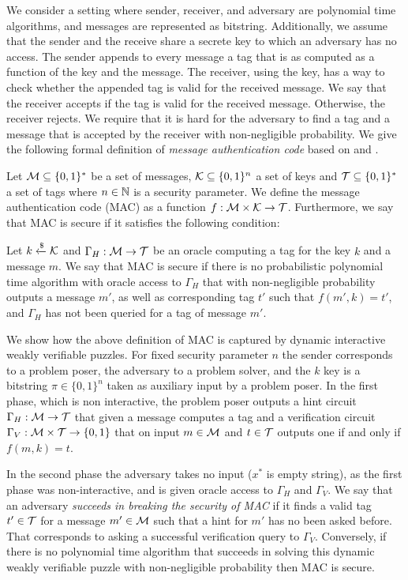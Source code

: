 \documentclass[11pt,a4paper,titlepage]{memoir}
\begin{document}
We consider a setting where sender, receiver, and adversary are polynomial time algorithms, and messages are represented as bitstring.
Additionally, we assume that the sender and the receive share a secrete key to which an adversary has no access.
The sender appends to every message a tag that is as computed as a function of the key and the message.
The receiver, using the key, has a way to check whether the appended tag is valid for the received message.
We say that the receiver accepts if the tag is valid for the received message. Otherwise, the receiver rejects.
We require that it is hard for the adversary to find a tag and a message that is accepted by the receiver with non-negligible probability.
We give the following formal definition of \textit{message authentication code} based on \cite{LectureNotesCrypo} and \cite{Goldreich:2004:FCV:975541}.
\begin{definition}
  Let $\mathcal{M} \subseteq \{0,1\}^*$ be a set of messages, $\mathcal{K} \subseteq \{0,1\}^{n}$ a set of keys and $\mathcal{T} \subseteq \{0,1\}^*$ a set of tags where $n \in \mathbb{N}$
  is a security parameter. We define the \textnormal{message authentication code (MAC)} as a function $f:\mathcal{M} \times \mathcal{K} \rightarrow \mathcal{T}$.
  Furthermore, we say that MAC is secure if it satisfies the following condition:

  Let $k \xleftarrow{\$} \mathcal{K}$ and $\Gamma_H: \mathcal{M} \rightarrow \mathcal{T}$ be an oracle computing
  a tag for the key $k$ and a message $m$. We say that MAC is secure if there is no probabilistic polynomial time algorithm with oracle access to $\Gamma_H$
  that with non-negligible probability outputs a message $m'$, as well as corresponding tag $t'$ such that $f(m', k) = t'$,
  and $\Gamma_H$ has not been queried for a tag of message $m'$.
\end{definition}

We show how the above definition of MAC is captured by dynamic interactive weakly verifiable puzzles.
For fixed security parameter $n$ the sender corresponds to a problem poser, the adversary to a problem solver, and
the $k$ key is a bitstring $\pi \in \{0,1\}^{n}$ taken as auxiliary input by a problem poser.
In the first phase, which is non interactive, the problem poser outputs a hint circuit
$\Gamma_H: \mathcal{M} \rightarrow \mathcal{T}$ that given a message computes a tag
and a verification circuit $\Gamma_V: \mathcal{M} \times \mathcal{T} \rightarrow \{0,1\}$ that on input $m \in \mathcal{M}$ and $t \in \mathcal{T}$
outputs one if and only if $f(m, k) = t$.

In the second phase the adversary takes no input ($x^*$ is empty string), as the first phase was non-interactive, and
is given oracle access to $\Gamma_H$ and $\Gamma_V$.
We say that an adversary \textit{succeeds in breaking the security of MAC} if it finds a valid tag $t' \in \mathcal{T}$ for a message $m' \in \mathcal{M}$ such that a hint for $m'$
has no been asked before. That corresponds to asking a successful verification query to $\Gamma_V$.
Conversely, if there is no polynomial time algorithm that succeeds in solving this dynamic weakly verifiable puzzle with non-negligible probability
then MAC is secure.
%
\end{document}
